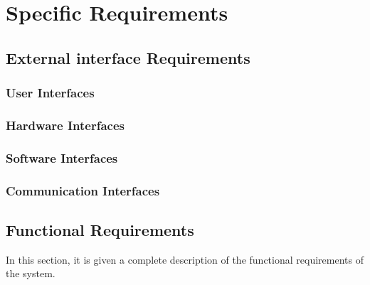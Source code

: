 \chapter{Specific Requirements}

\section{External interface Requirements}
\subsection{User Interfaces}
\subsection{Hardware Interfaces}
\subsection{Software Interfaces}
\subsection{Communication Interfaces}

\section{Functional Requirements}
In this section, it is given a complete description of the functional requirements of the system.

